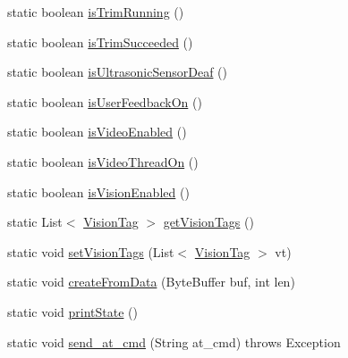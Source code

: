 \begin{DoxyCompactItemize}
\item 
static boolean \hyperlink{classworkspace_1_1_a_r_drone_nav_data_1_1src_1_1controller_1_1_drone_test_ad57b470a5b11a8f6ad16d6a788acfa63}{is\+Trim\+Running} ()
\item 
static boolean \hyperlink{classworkspace_1_1_a_r_drone_nav_data_1_1src_1_1controller_1_1_drone_test_aaac83c2ba93b36366c34ea312ae6c1ea}{is\+Trim\+Succeeded} ()
\item 
static boolean \hyperlink{classworkspace_1_1_a_r_drone_nav_data_1_1src_1_1controller_1_1_drone_test_afc9681fbe6e9233c252d00b01c73ab55}{is\+Ultrasonic\+Sensor\+Deaf} ()
\item 
static boolean \hyperlink{classworkspace_1_1_a_r_drone_nav_data_1_1src_1_1controller_1_1_drone_test_a818eedae2f152e0ee110ef3f77bfba4e}{is\+User\+Feedback\+On} ()
\item 
static boolean \hyperlink{classworkspace_1_1_a_r_drone_nav_data_1_1src_1_1controller_1_1_drone_test_acd8bae301c4c09a29714e50add4ab36a}{is\+Video\+Enabled} ()
\item 
static boolean \hyperlink{classworkspace_1_1_a_r_drone_nav_data_1_1src_1_1controller_1_1_drone_test_a83d9af4c8b620d735e467ddc3298e225}{is\+Video\+Thread\+On} ()
\item 
static boolean \hyperlink{classworkspace_1_1_a_r_drone_nav_data_1_1src_1_1controller_1_1_drone_test_a154bb5c2089038608eba8aa5ecbb4089}{is\+Vision\+Enabled} ()
\item 
static List$<$ \hyperlink{classworkspace_1_1_a_r_drone_nav_data_1_1src_1_1controller_1_1_vision_tag}{Vision\+Tag} $>$ \hyperlink{classworkspace_1_1_a_r_drone_nav_data_1_1src_1_1controller_1_1_drone_test_a65fec5208de294e5d1640ec5e44b383a}{get\+Vision\+Tags} ()
\item 
static void \hyperlink{classworkspace_1_1_a_r_drone_nav_data_1_1src_1_1controller_1_1_drone_test_a01db93bd212a1ebc82844f01922f8284}{set\+Vision\+Tags} (List$<$ \hyperlink{classworkspace_1_1_a_r_drone_nav_data_1_1src_1_1controller_1_1_vision_tag}{Vision\+Tag} $>$ vt)
\item 
static void \hyperlink{classworkspace_1_1_a_r_drone_nav_data_1_1src_1_1controller_1_1_drone_test_aa4c10cb1b2c95573f9c49fe9bb943f6d}{create\+From\+Data} (Byte\+Buffer buf, int len)
\item 
static void \hyperlink{classworkspace_1_1_a_r_drone_nav_data_1_1src_1_1controller_1_1_drone_test_a05fb24f0297add05fe4e8aae1c4a5c77}{print\+State} ()
\item 
static void \hyperlink{classworkspace_1_1_a_r_drone_nav_data_1_1src_1_1controller_1_1_drone_test_a5c7c7338901c8cf9a91789656a4aa54f}{send\+\_\+at\+\_\+cmd} (String at\+\_\+cmd)  throws Exception      
\end{DoxyCompactItemize}
